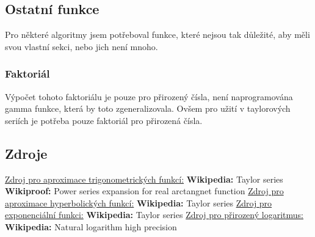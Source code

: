 \documentclass{article}
\begin{document}
    \subsection{Ostatní funkce}
    Pro některé algoritmy jsem potřeboval funkce, které nejsou tak důležité, aby měli svou vlastní sekci, nebo jich
    není mnoho.
    \subsubsection{Faktoriál}
    Výpočet tohoto faktoriálu je pouze pro přirozený čísla, není naprogramována gamma funkce, která by toto zgeneralizovala.
    Ovšem pro užití v taylorových seriích je potřeba pouze faktoriál pro přirozená čísla.

    \subsection{Zdroje}
    \underline{Zdroj pro aproximace trigonometrických funkcí:} \newline
    \indent \textbf{Wikipedia:} Taylor series \newline
    \indent \textbf{Wikiproof:} Power series expansion for real arctangnet function \newline
    \underline{Zdroj pro aproximace hyperbolických funkcí:} \newline
    \indent \textbf{Wikipedia:} Taylor series \newline
    \underline{Zdroj pro exponenciální funkci:} \newline
    \indent \textbf{Wikipedia:} Taylor series \newline
    \underline{Zdroj pro přirozený logaritmus:} \newline
    \indent \textbf{Wikipedia:} Natural logarithm high precision \newline
    
\end{document}
